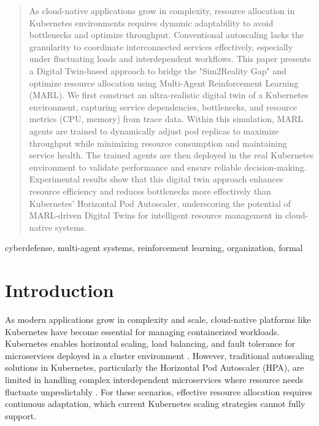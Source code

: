 \documentclass[conference]{IEEEtran}
\begin{document}
\maketitle

\begin{abstract}

    As cloud-native applications grow in complexity, resource allocation in Kubernetes environments requires dynamic adaptability to avoid bottlenecks and optimize throughput.
    Conventional autoscaling lacks the granularity to coordinate interconnected services effectively, especially under fluctuating loads and interdependent workflows.
    This paper presents a Digital Twin-based approach to bridge the "Sim2Reality Gap" and optimize resource allocation using Multi-Agent Reinforcement Learning (MARL). We first construct an ultra-realistic digital twin of a Kubernetes environment, capturing service dependencies, bottlenecks, and resource metrics (CPU, memory) from trace data. Within this simulation, MARL agents are trained to dynamically adjust pod replicas to maximize throughput while minimizing resource consumption and maintaining service health. The trained agents are then deployed in the real Kubernetes environment to validate performance and ensure reliable decision-making.
    Experimental results show that this digital twin approach enhances resource efficiency and reduces bottlenecks more effectively than Kubernetes’ Horizontal Pod Autoscaler, underscoring the potential of MARL-driven Digital Twins for intelligent resource management in cloud-native systems.

\end{abstract}

\begin{IEEEkeywords}
    cyberdefense, multi-agent systems, reinforcement learning, organization, formal
\end{IEEEkeywords}

\section{Introduction}

As modern applications grow in complexity and scale, cloud-native platforms like Kubernetes have become essential for managing containerized workloads. Kubernetes enables horizontal scaling, load balancing, and fault tolerance for microservices deployed in a cluster environment \cite{hpa_design}. However, traditional autoscaling solutions in Kubernetes, particularly the Horizontal Pod Autoscaler (HPA), are limited in handling complex interdependent microservices where resource needs fluctuate unpredictably \cite{rosenberg_k8s_autoscaling}. For these scenarios, effective resource allocation requires continuous adaptation, which current Kubernetes scaling strategies cannot fully support.
\end{document}
